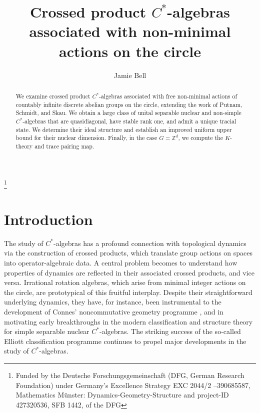 \documentclass[11pt,a4paper,leqno]{amsart}
\theoremstyle{definition}
\theoremstyle{remark}
\numberwithin{equation}{section}
\theoremstyle{plain}
\newcommand{\Zb}{\mathbb{Z}}
\begin{document}
\begin{abstract}
    We examine crossed product $C^*$-algebras associated with free non-minimal actions of countably infinite discrete abelian groups on the circle, extending the work of Putnam, Schmidt, and Skau. We obtain a large class of unital separable nuclear and non-simple $C^*$-algebras that are quasidiagonal, have stable rank one, and admit a unique tracial state. We determine their ideal structure and establish an improved uniform upper bound for their nuclear dimension. Finally, in the case $G = \Zb^d$, we compute the $K$-theory and trace pairing map.
\end{abstract}


 
\title[$C^*$-algebras associated with non-minimal actions on the circle]{Crossed product $C^*$-algebras associated with non-minimal actions on the circle}
\author{Jamie Bell}
\address{Jamie Bell, Mathematical Institute, University of Münster, Einsteinstrasse 62, 48149 Münster, Germany.}

\thanks{Funded by the Deutsche Forschungsgemeinschaft (DFG, German Research Foundation) under Germany's Excellence Strategy EXC 2044/2 –390685587, Mathematics M\"unster: Dynamics-Geometry-Structure and project-ID 427320536, SFB 1442, of the DFG}

\maketitle

\section{Introduction}

The study of $C^*$-algebras has a profound connection with topological dynamics via the construction of crossed products, which translate group actions on spaces into operator-algebraic data. A central problem becomes to understand how properties of dynamics are reflected in their associated crossed products, and vice versa. Irrational rotation algebras, which arise from minimal integer actions on the circle, are prototypical of this fruitful interplay. Despite their straightforward underlying dynamics, they have, for instance, been instrumental to the development of Connes' noncommutative geometry programme \cite{Con94}, and in motivating early breakthroughs in the modern classification and structure theory for simple separable nuclear $C^*$-algebras. The striking success of the so-called Elliott classification programme continues to propel major developments in the study of $C^*$-algebras. 
\end{document}
